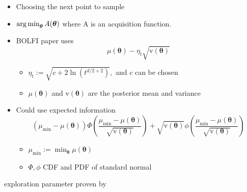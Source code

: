\begin{itemize}
    \item Choosing the next point to sample
    \item $\operatorname*{arg\,min}_{\bm{\theta}}A(\bm\theta)$ where A is an acquisition function.
    \item BOLFI paper uses $$\mu(\bm\theta) - \eta_t\sqrt{\mathrm{v}(\bm\theta)}$$ \begin{itemize}
              \item $\eta_t:= \sqrt{c + 2\ln(t^{d/2 + 2})},$ and $c$ can be chosen
              \item $\mu(\bm\theta)$ and $\mathrm{v}(\bm\theta)$ are the posterior mean and variance
          \end{itemize}

    \item Could use expected information $$(\mu_\text{min} - \mu(\bm\theta))
              \varPhi\left(\frac{\mu_\text{min} - \mu(\bm\theta)}{\sqrt{\mathrm{v}(\bm\theta)}}\right) + \sqrt{\mathrm{v}(\bm\theta)}
              \phi\left(\frac{\mu_\text{min} - \mu(\bm\theta)}{\sqrt{\mathrm{v}(\bm\theta)}}\right)$$\begin{itemize}
              \item $\mu_\text{min} := \min_{\bm{\theta}} \mu(\bm\theta)$
              \item $\varPhi, \phi$ CDF and PDF of standard normal
          \end{itemize}
\end{itemize}

exploration parameter proven by \cite{srinivas_gaussian_2010}